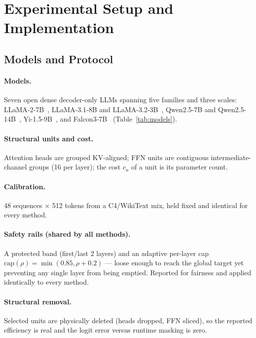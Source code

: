\section{Experimental Setup and Implementation}\label{app:psetup}

\subsection{Models and Protocol}
\label{app:setup}
\paragraph{Models.} Seven open dense decoder-only LLMs spanning five families and three scales:
LLaMA-2-7B~\citep{touvron2023llama2}, LLaMA-3.1-8B and LLaMA-3.2-3B~\citep{dubey2024llama3},
Qwen2.5-7B and Qwen2.5-14B~\citep{qwen2025qwen25}, Yi-1.5-9B~\citep{ai2024yi}, and
Falcon3-7B~\citep{falcon3} (Table~\ref{tab:models}).

\paragraph{Structural units and cost.} Attention heads are grouped KV-aligned; FFN units are contiguous
intermediate-channel groups (16 per layer); the cost $c_u$ of a unit is its parameter count.

\paragraph{Calibration.} 48 sequences $\times$ 512 tokens from a C4/WikiText mix, held fixed and
identical for every method.

\paragraph{Safety rails (shared by all methods).} A protected band (first/last 2 layers) and an adaptive
per-layer cap $\mathrm{cap}(\rho)=\min(0.85,\rho{+}0.2)$ --- loose enough to reach the global target yet
preventing any single layer from being emptied. Reported for fairness and applied identically to every method.

\paragraph{Structural removal.} Selected units are physically deleted (heads dropped, FFN sliced), so the
reported efficiency is real and the logit error versus runtime masking is zero.

